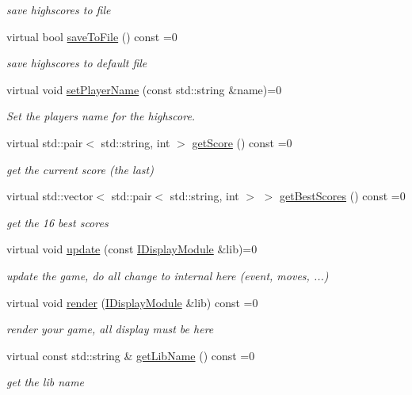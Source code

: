 \begin{DoxyCompactItemize}
\begin{DoxyCompactList}\small\item\em save highscores to file \end{DoxyCompactList}\item 
virtual bool \hyperlink{class_i_game_module_aa2db580e935b917bdcfbd480771d2e8a}{save\+To\+File} () const =0
\begin{DoxyCompactList}\small\item\em save highscores to default file \end{DoxyCompactList}\item 
virtual void \hyperlink{class_i_game_module_ac4ca30b5a3fef73f213729baaaa98a46}{set\+Player\+Name} (const std\+::string \&name)=0
\begin{DoxyCompactList}\small\item\em Set the player\textquotesingle{}s name for the highscore. \end{DoxyCompactList}\item 
virtual std\+::pair$<$ std\+::string, int $>$ \hyperlink{class_i_game_module_a10133f024c107b05c37510facf27c21c}{get\+Score} () const =0
\begin{DoxyCompactList}\small\item\em get the current score (the last) \end{DoxyCompactList}\item 
virtual std\+::vector$<$ std\+::pair$<$ std\+::string, int $>$ $>$ \hyperlink{class_i_game_module_ac83b190c55b2557d06bbec22746c2c17}{get\+Best\+Scores} () const =0
\begin{DoxyCompactList}\small\item\em get the 16 best scores \end{DoxyCompactList}\item 
virtual void \hyperlink{class_i_game_module_ab49e35fa262602b563131ddacce11b7c}{update} (const \hyperlink{class_i_display_module}{I\+Display\+Module} \&lib)=0
\begin{DoxyCompactList}\small\item\em update the game, do all change to internal here (event, moves, ...) \end{DoxyCompactList}\item 
virtual void \hyperlink{class_i_game_module_a6a2489a66aaea6255e35b6f025d08460}{render} (\hyperlink{class_i_display_module}{I\+Display\+Module} \&lib) const =0
\begin{DoxyCompactList}\small\item\em render your game, all display must be here \end{DoxyCompactList}\item 
virtual const std\+::string \& \hyperlink{class_i_game_module_aef6b69aca908bbbc77e52b729afd1ced}{get\+Lib\+Name} () const =0
\begin{DoxyCompactList}\small\item\em get the lib name \end{DoxyCompactList}\end{DoxyCompactItemize}


